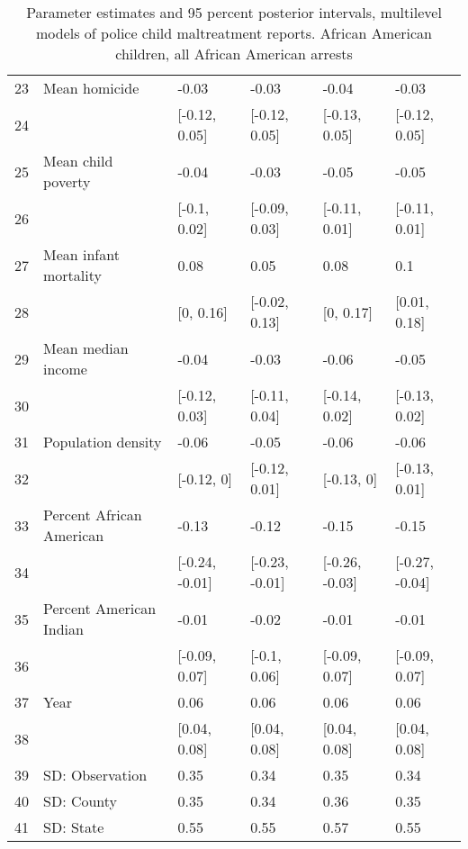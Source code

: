\begin{table}[ht]
\begin{tabular}{rlllll}
  23 & Mean homicide & -0.03 & -0.03 & -0.04 & -0.03 \\ 
  24 &  & [-0.12, 0.05] & [-0.12, 0.05] & [-0.13, 0.05] & [-0.12, 0.05] \\ 
  25 & Mean child poverty & -0.04 & -0.03 & -0.05 & -0.05 \\ 
  26 &  & [-0.1, 0.02] & [-0.09, 0.03] & [-0.11, 0.01] & [-0.11, 0.01] \\ 
  27 & Mean infant mortality & 0.08 & 0.05 & 0.08 & 0.1 \\ 
  28 &  & [0, 0.16] & [-0.02, 0.13] & [0, 0.17] & [0.01, 0.18] \\ 
  29 & Mean median income & -0.04 & -0.03 & -0.06 & -0.05 \\ 
  30 &  & [-0.12, 0.03] & [-0.11, 0.04] & [-0.14, 0.02] & [-0.13, 0.02] \\ 
  31 & Population density & -0.06 & -0.05 & -0.06 & -0.06 \\ 
  32 &  & [-0.12, 0] & [-0.12, 0.01] & [-0.13, 0] & [-0.13, 0.01] \\ 
  33 & Percent African American & -0.13 & -0.12 & -0.15 & -0.15 \\ 
  34 &  & [-0.24, -0.01] & [-0.23, -0.01] & [-0.26, -0.03] & [-0.27, -0.04] \\ 
  35 & Percent American Indian & -0.01 & -0.02 & -0.01 & -0.01 \\ 
  36 &  & [-0.09, 0.07] & [-0.1, 0.06] & [-0.09, 0.07] & [-0.09, 0.07] \\ 
  37 & Year & 0.06 & 0.06 & 0.06 & 0.06 \\ 
  38 &  & [0.04, 0.08] & [0.04, 0.08] & [0.04, 0.08] & [0.04, 0.08] \\ 
  39 & SD: Observation & 0.35 & 0.34 & 0.35 & 0.34 \\ 
  40 & SD: County & 0.35 & 0.34 & 0.36 & 0.35 \\ 
  41 & SD: State & 0.55 & 0.55 & 0.57 & 0.55 \\ 
   \hline
\end{tabular}
\caption{Parameter estimates and 95 percent posterior intervals, multilevel models of 
             police child maltreatment reports. African American children, all African American arrests} 
\end{table}
